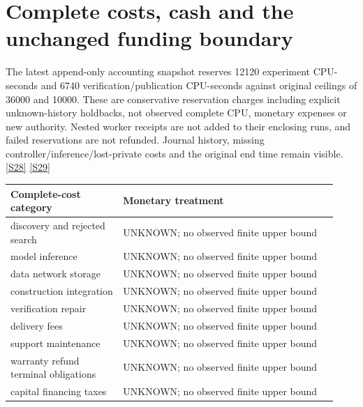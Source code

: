 \documentclass[11pt,letterpaper]{article}
\begin{document}
\section{Complete costs, cash and the unchanged funding boundary}
The latest append-only accounting snapshot reserves 12120 experiment CPU-seconds and 6740 verification/publication CPU-seconds against original ceilings of 36000 and 10000. These are conservative reservation charges including explicit unknown-history holdbacks, not observed complete CPU, monetary expenses or new authority. Nested worker receipts are not added to their enclosing runs, and failed reservations are not refunded. Journal history, missing controller/inference/lost-private costs and the original end time remain visible. \href{https://github.com/MontrealAI/AGI-Alpha-Invention-Flywheel-Lab/blob/2b7a58e6e6593ae48da6f7f33865db94868c957f/campaign/overnight-008/economics/recovery/run008/CUMULATIVE_COST_RESOURCE.json}{[S28]} \href{https://github.com/MontrealAI/AGI-Alpha-Invention-Flywheel-Lab/blob/2b7a58e6e6593ae48da6f7f33865db94868c957f/campaign/overnight-008/economics/recovery/run002/CUMULATIVE_COST_RESOURCE.json}{[S29]}\par
\begingroup\small\begin{longtable}{>{\raggedright\arraybackslash}p{0.32\linewidth}>{\raggedright\arraybackslash}p{0.61\linewidth}}\toprule
\textbf{Complete-cost category} & \textbf{Monetary treatment}\\\midrule\endhead
discovery and rejected search & UNKNOWN; no observed finite upper bound\\
model inference & UNKNOWN; no observed finite upper bound\\
data network storage & UNKNOWN; no observed finite upper bound\\
construction integration & UNKNOWN; no observed finite upper bound\\
verification repair & UNKNOWN; no observed finite upper bound\\
delivery fees & UNKNOWN; no observed finite upper bound\\
support maintenance & UNKNOWN; no observed finite upper bound\\
warranty refund terminal obligations & UNKNOWN; no observed finite upper bound\\
capital financing taxes & UNKNOWN; no observed finite upper bound\\
\bottomrule\end{longtable}\endgroup
\end{document}
